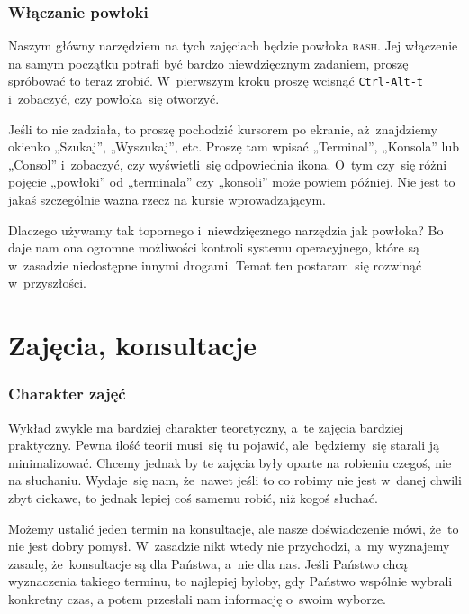 \documentclass[10pt,t]{beamer}
\begin{document}
\begin{frame}
  \frametitle{Włączanie powłoki}


  Naszym główny narzędziem na tych zajęciach będzie powłoka \textsc{bash}.
  Jej włączenie na samym początku potrafi być bardzo niewdzięcznym zadaniem,
  proszę spróbować to teraz zrobić. W~pierwszym kroku proszę wcisnąć
  \texttt{Ctrl-Alt-t} i~zobaczyć, czy powłoka~się otworzyć.

  Jeśli to nie zadziała, to proszę pochodzić kursorem po ekranie,
  aż~znajdziemy okienko „Szukaj”, „Wyszukaj”, etc. Proszę tam wpisać
  „Terminal”, „Konsola” lub „Consol” i~zobaczyć, czy wyświetli~się
  odpowiednia ikona. O~tym czy~się różni pojęcie „powłoki” od „terminala”
  czy „konsoli” może powiem później. Nie jest to jakaś szczególnie ważna
  rzecz na kursie wprowadzającym.

  Dlaczego używamy tak topornego i~niewdzięcznego narzędzia jak powłoka?
  Bo daje nam ona ogromne możliwości kontroli systemu operacyjnego, które
  są w~zasadzie niedostępne innymi drogami. Temat ten postaram~się rozwinąć
  w~przyszłości.

\end{frame}










\section{Zajęcia, konsultacje}


\begin{frame}
  \frametitle{Charakter zajęć}


  Wykład zwykle ma bardziej charakter teoretyczny, a~te zajęcia bardziej
  \alert{praktyczny}. Pewna ilość teorii musi~się tu pojawić,
  ale~będziemy~się starali ją minimalizować. Chcemy jednak by te zajęcia
  były oparte na \alert{robieniu} czegoś, nie na słuchaniu. Wydaje~się nam,
  że~nawet jeśli to co robimy nie jest w~danej chwili zbyt ciekawe, to
  jednak lepiej coś samemu robić, niż kogoś słuchać.

  Możemy ustalić jeden termin na konsultacje, ale nasze doświadczenie mówi,
  że~to nie jest dobry pomysł. W~zasadzie nikt wtedy nie przychodzi, a~my
  wyznajemy zasadę, że~konsultacje są dla Państwa, a~nie dla nas. Jeśli
  Państwo chcą wyznaczenia takiego terminu, to najlepiej byłoby, gdy Państwo
  wspólnie wybrali konkretny czas, a potem przesłali nam informację
  o~swoim wyborze.

\end{frame}
\end{document}
